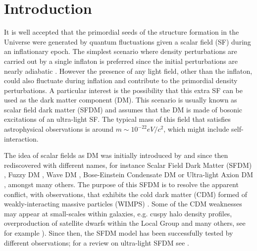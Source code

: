 \documentclass[amssymb,twocolumn,prd,nofootinbib,showpacs]{revtex4-1}
\begin{document}
\maketitle


\section{Introduction}
\label{introduction}

It is well accepted that the primordial seeds of the structure formation in the Universe were generated by quantum 
fluctuations given a scalar field (SF) during an inflationary epoch. 
The simplest scenario where density perturbations are carried out by a single inflaton is preferred 
since the initial perturbations are nearly adiabatic \cite{const1,const2,planck}. 
However the presence of any light field, other than the inflaton, could also fluctuate during inflation and 
contribute to the primordial density perturbations. A particular interest is the possibility that this extra SF 
can be used as the dark matter component (DM). This scenario is usually known 
as scalar field dark matter (SFDM) and assumes that the DM is made of bosonic excitations of an ultra-light SF. 
The typical mass of this field that satisfies astrophysical observations is around 
$m\sim 10^{-22}eV/c^2$, which might include self-interaction.
%

The idea of scalar fields as DM was initially introduced by \cite{SF1} and since then rediscovered 
with different names, for instance Scalar Field Dark Matter  (SFDM)  \cite{SF2},  Fuzzy  DM  \cite{SF3}, 
Wave DM \cite{SF4,SF5}, Bose-Einstein Condensate DM \cite{SF6} or Ultra-light Axion DM \cite{SF7,SF8}, 
amongst many others. 
%
The purpose of this SFDM is to resolve the apparent conflict, with observations, that exhibits the
cold dark matter (CDM) formed of weakly-interacting massive particles (WIMPS) \cite{LCDM1,LCDM2}. 
Some of the CDM weaknesses may appear at small-scales within galaxies, e.g. cuspy halo density profiles, overproduction of 
satellite dwarfs within the Local Group and many others, see for example 
\cite{problem1,problem2,problem3,problem4,problem5}). 
Since then, the SFDM model has been successfully tested by different observations;  
for a review on ultra-light SFDM see \cite{SF9,SF10,SF11,SF12}. 
\end{document}
